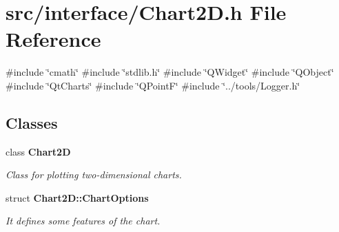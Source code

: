 \section{src/interface/\+Chart2D.h File Reference}
\label{_chart2_d_8h}
{\ttfamily \#include \char`\"{}cmath\char`\"{}}\newline
{\ttfamily \#include \char`\"{}stdlib.\+h\char`\"{}}\newline
{\ttfamily \#include \char`\"{}Q\+Widget\char`\"{}}\newline
{\ttfamily \#include \char`\"{}Q\+Object\char`\"{}}\newline
{\ttfamily \#include \char`\"{}Qt\+Charts\char`\"{}}\newline
{\ttfamily \#include \char`\"{}Q\+PointF\char`\"{}}\newline
{\ttfamily \#include \char`\"{}../tools/\+Logger.\+h\char`\"{}}\newline
\subsection*{Classes}
\begin{DoxyCompactItemize}
\item 
class \textbf{ Chart2D}
\begin{DoxyCompactList}\small\item\em Class for plotting two-\/dimensional charts. \end{DoxyCompactList}\item 
struct \textbf{ Chart2\+D\+::\+Chart\+Options}
\begin{DoxyCompactList}\small\item\em It defines some features of the chart. \end{DoxyCompactList}\end{DoxyCompactItemize}
